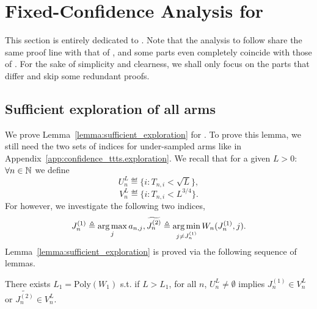 \section{Fixed-Confidence Analysis for \texorpdfstring{\TCC}{}}\label{app:confidence_t3c}

This section is entirely dedicated to \TCC. Note that the analysis to follow share the same proof line with that of \TTTS, and some parts even completely coincide with those of \TTTS. For the sake of simplicity and clearness, we shall only focus on the parts that differ and skip some redundant proofs. 

\subsection{Sufficient exploration of all arms}\label{app:confidence_t3c.exploration}

We prove Lemma~\ref{lemma:sufficient_exploration} for \TCC. To prove this lemma, we still need the two sets of indices for under-sampled arms like in Appendix~\ref{app:confidence_ttts.exploration}. We recall that for a given $L>0$: $\forall n\in{\mathbb N}$ we define
\[
    U_n^L \eqdef \{i: T_{n,i} < \sqrt{L}\},
\]
\[
    V_n^L \eqdef \{i: T_{n,i} < L^{3/4}\}.
\]
For \TCC however, we investigate the following two indices,
\[
    J_n^{(1)} \triangleq \operatorname*{arg\,max}_{j} a_{n,j}, \widetilde{J_n^{(2)}} \triangleq \operatorname*{arg\,min}_{j\neq J_n^{(1)}} W_n(J_n^{(1)},j).
\]
Lemma~\ref{lemma:sufficient_exploration} is proved via the following sequence of lemmas.

\begin{lemma}\label{lemma:link_t3c}
    There exists $L_1 = \text{Poly}(W_1)$ s.t. if $L > L_1$, for all $n$, $U_n^L \neq \emptyset$ implies $J_n^{(1)} \in V_n^L$ or $\tilde{J_n^{(2)}} \in V_n^L$.
\end{lemma}

